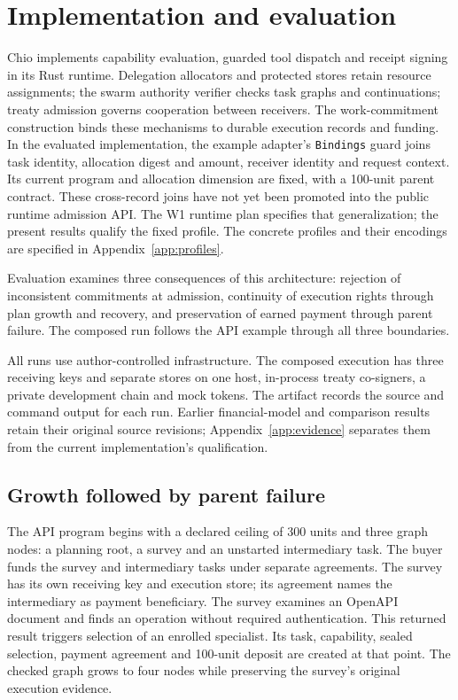 \section{Implementation and evaluation}
\label{sec:evaluation}
Chio implements capability evaluation, guarded tool dispatch and receipt signing
in its Rust runtime. Delegation allocators and protected stores retain resource
assignments; the swarm authority verifier checks task graphs and continuations;
treaty admission governs cooperation between receivers. The work-commitment
construction binds these mechanisms to durable execution records and funding.
In the evaluated implementation, the example adapter's \texttt{Bindings} guard
joins task identity, allocation digest and amount, receiver identity and request
context. Its current program and allocation dimension are fixed, with a 100-unit
parent contract. These cross-record joins have not yet been promoted into the
public runtime admission API. The W1 runtime plan specifies that generalization;
the present results qualify the fixed profile.
The concrete profiles and their encodings are specified in
Appendix~\ref{app:profiles}.

Evaluation examines three consequences of this architecture: rejection of
inconsistent commitments at admission, continuity of execution rights through
plan growth and recovery, and preservation of earned payment through parent
failure. The composed run follows the API example through all three boundaries.

All runs use author-controlled infrastructure. The composed execution has three
receiving keys and separate stores on one host, in-process treaty co-signers,
a private development chain and mock tokens. The artifact records the source
and command output for each run. Earlier financial-model and comparison results
retain their original source revisions; Appendix~\ref{app:evidence} separates
them from the current implementation's qualification.

\subsection{Growth followed by parent failure}
The API program begins with a declared ceiling of 300 units and three graph
nodes: a planning root, a survey and an unstarted intermediary task. The buyer
funds the survey and intermediary tasks under separate agreements. The survey
has its own receiving key and execution store; its agreement names the
intermediary as payment beneficiary. The survey examines an OpenAPI document
and finds an operation without required
authentication. This returned result triggers selection of an enrolled
specialist. Its task, capability, sealed selection, payment agreement and
100-unit deposit are created at that point. The checked graph grows to four
nodes while preserving the survey's original execution evidence.

